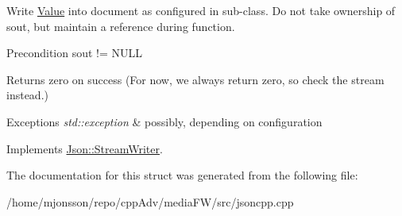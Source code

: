 Write \hyperlink{classJson_1_1Value}{Value} into document as configured in sub-\/class. Do not take ownership of sout, but maintain a reference during function. \begin{DoxyPrecond}{Precondition}
sout != N\+U\+LL 
\end{DoxyPrecond}
\begin{DoxyReturn}{Returns}
zero on success (For now, we always return zero, so check the stream instead.) 
\end{DoxyReturn}

\begin{DoxyExceptions}{Exceptions}
{\em std\+::exception} & possibly, depending on configuration \\
\hline
\end{DoxyExceptions}


Implements \hyperlink{classJson_1_1StreamWriter_a84278bad0c9a9fc587bc2a97c5bb5993}{Json\+::\+Stream\+Writer}.



The documentation for this struct was generated from the following file\+:\begin{DoxyCompactItemize}
\item 
/home/mjonsson/repo/cpp\+Adv/media\+F\+W/src/jsoncpp.\+cpp\end{DoxyCompactItemize}
